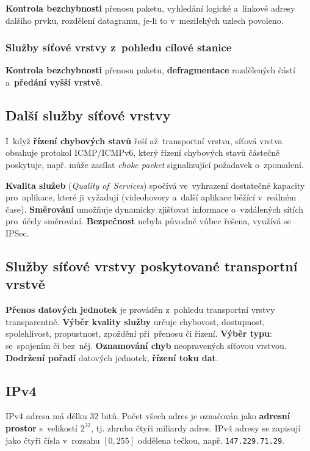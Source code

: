 \textbf{Kontrola bezchybnosti} přenosu paketu, vyhledání logické a~linkové adresy dalšího prvku, rozdělení datagramu, je-li to v~mezilehých uzlech povoleno.

\subsubsection{Služby síťové vrstvy z~pohledu cílové stanice}

\textbf{Kontrola bezchybnosti} přenosu paketu, \textbf{defragmentace} rozdělených částí a~\textbf{předání vyšší vrstvě}.

\subsection{Další služby síťové vrstvy}

I~když \textbf{řízení chybových stavů} řeší až~transportní vrstva, síťová vrstva obsahuje protokol ICMP/ICMPv6, který řízení chybových stavů částečně poskytuje, např. může zasílat \emph{choke packet} signalizující požadavek o~zpomalení.

\textbf{Kvalita služeb} (\emph{Quality of~Services}) spočívá ve~vyhrazení dostatečné kapacity pro~aplikace, které ji vyžadují (videohovory a~další aplikace běžící v~reálném čase). \textbf{Směrování} umožňuje dynamicky zjišťovat informace o~vzdálených sítích pro~účely směrování. \textbf{Bezpečnost} nebyla původně vůbec řešena, využívá se IPSec.

\subsection{Služby síťové vrstvy poskytované transportní vrstvě}

\textbf{Přenos datových jednotek} je prováděn z~pohledu transportní vrstvy transparentně. \textbf{Výběr kvality služby} určuje chybovost, dostupnost, spolehlivost, propustnost, zpoždění při~přenosu či řízení. \textbf{Výběr typu}: se~spojením či bez~něj. \textbf{Oznamování chyb} neopravených síťovou vrstvou. \textbf{Dodržení pořadí} datových jednotek, \textbf{řízení toku dat}.

\subsection{IPv4}

IPv4 adresa má délku 32 bitů. Počet všech adres je označován jako \textbf{adresní prostor} s~velikostí $2^{32}$, tj. zhruba čtyři miliardy adres. IPv4 adresy se zapisují jako čtyři čísla v~rozsahu $[0, 255]$ oddělena tečkou, např. \texttt{147.229.71.29}.

